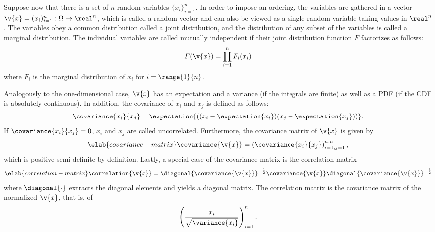 Suppose now that there is a set of $n$ random variables $\{ x_i \}_{i = 1}^n$.
In order to impose an ordering, the variables are gathered in a vector $\v{x} =
(x_i)_{i = 1}^n: \Omega \to \real^n$, which is called a random vector and can
also be viewed as a single random variable taking values in $\real^n$. The
variables obey a common distribution called a joint distribution, and the
distribution of any subset of the variables is called a marginal distribution.
The individual variables are called mutually independent if their joint
distribution function $F$ factorizes as follows:
\[
  F(\v{x}) = \prod_{i = 1}^n F_i(x_i)
\]
where $F_i$ is the marginal distribution of $x_i$ for $i = \range{1}{n}$.

Analogously to the one-dimensional case, $\v{x}$ has an expectation and a
variance (if the integrals are finite) as well as a \ac{PDF} (if the \ac{CDF} is
absolutely continuous). In addition, the covariance of $x_i$ and $x_j$ is
defined as follows:
\[
  \covariance{x_i}{x_j} = \expectation{((x_i - \expectation{x_i})(x_j - \expectation{x_j}))}.
\]
If $\covariance{x_i}{x_j} = 0$, $x_i$ and $x_j$ are called uncorrelated.
Furthermore, the covariance matrix of $\v{x}$ is given by
\begin{equation} \elab{covariance-matrix}
  \covariance{\v{x}} = \left(\covariance{x_i}{x_j}\right)_{i = 1, j = 1}^{n, n},
\end{equation}
which is positive semi-definite by definition. Lastly, a special case of the
covariance matrix is the correlation matrix
\begin{equation} \elab{correlation-matrix}
  \correlation{\v{x}} = \diagonal{\covariance{\v{x}}}^{-\frac{1}{2}} \covariance{\v{x}} \diagonal{\covariance{\v{x}}}^{-\frac{1}{2}}
\end{equation}
where $\diagonal{\cdot}$ extracts the diagonal elements and yields a diagonal
matrix. The correlation matrix is the covariance matrix of the normalized
$\v{x}$, that is, of
\[
  \left(\frac{x_i}{\sqrt{\variance{x_i}}}\right)_{i = 1}^n.
\]
